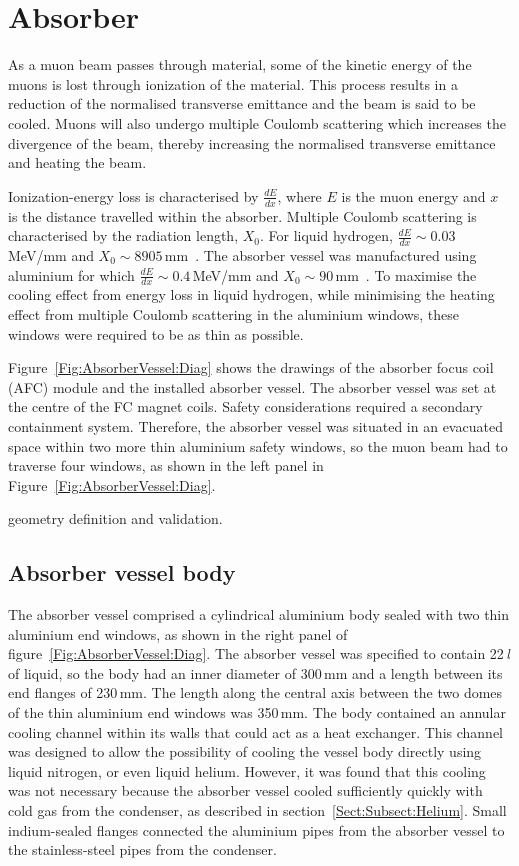 \graphicspath{{11-Absorber/Figures/}}

\section{Absorber}
\label{Sect:Absorber}
As a muon beam passes through material, some of the kinetic energy
of the muons is lost through ionization of the material.
This process results in a reduction of the normalised
transverse emittance and the beam is said to be cooled.
Muons will also undergo multiple Coulomb scattering which
increases the divergence of the beam, thereby
increasing the normalised transverse emittance and heating the beam.

Ionization-energy loss is characterised by $\frac{dE}{dx}$, where $E$
is the muon energy and $x$ is the distance travelled within the
absorber.
Multiple Coulomb scattering is characterised by the radiation length,
$X_0$.
For liquid hydrogen, $\frac{dE}{dx} \sim 0.03$\,MeV/mm and $X_0 \sim
8905$\,mm~\cite{Tanabashi:2018xxx}.
The absorber vessel was manufactured using aluminium for which
$\frac{dE}{dx} \sim 0.4$\,MeV/mm and $X_0\sim
90$\,mm~\cite{Tanabashi:2018xxx}.
To maximise the cooling effect from energy loss in liquid hydrogen,
while minimising the heating effect from multiple Coulomb scattering
in the aluminium windows, these windows were required to be as thin as possible.

Figure~\ref{Fig:AbsorberVessel:Diag} shows the drawings of the absorber focus coil (AFC) module and the installed absorber vessel. The absorber vessel was set at the centre of the FC magnet coils.  Safety considerations required a secondary containment system. Therefore, the absorber vessel was situated in an evacuated space within two more thin aluminium safety windows, so the muon beam had to traverse four windows, as shown in the left panel in Figure~\ref{Fig:AbsorberVessel:Diag}.

geometry definition and validation.

\subsection{Absorber vessel body}
\label{SubSect:AbsorberVessel:Body}

The absorber vessel comprised a cylindrical aluminium body sealed with
two thin aluminium end windows, as shown in the right panel of
figure~\ref{Fig:AbsorberVessel:Diag}.
The absorber vessel was specified to contain 22\,\textit{l} of liquid, so
the body had an inner diameter of 300\,mm and a length between its end
flanges of 230\,mm.  
The length along the central axis between the two domes of the thin aluminium end
windows was 350\,mm.
The body contained an annular cooling channel within its walls
that could act as a heat exchanger. 
This channel was designed to allow the possibility of cooling the
vessel body directly using liquid nitrogen, or even liquid helium. 
However, it was found that this cooling was not necessary because the absorber vessel
cooled sufficiently quickly with cold gas from the condenser,
as described in section~\ref{Sect:Subsect:Helium}. 
Small indium-sealed flanges connected the aluminium pipes from
the absorber vessel to the stainless-steel pipes from the condenser. 

